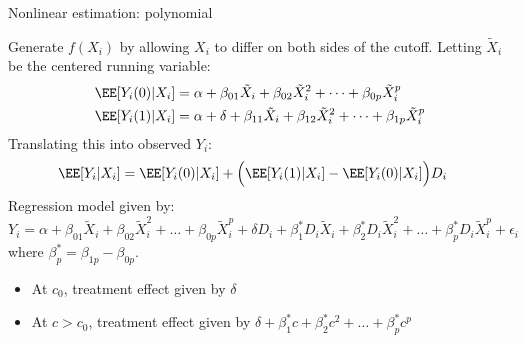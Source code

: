 \begin{frame}{Nonlinear estimation: polynomial}

Generate $f(X_i)$ by allowing $X_i$ to differ on both sides of the cutoff. Letting $\tilde{X}_i$ be the centered running variable:
\begin{align*}
    \EE [Y_i (0) \vert X_i] &= \alpha + \beta_{01} \tilde{X}_i + \beta_{02} \tilde{X}_i^2 + \dots + \beta_{0p} \tilde{X}_i^p \\
    \EE [Y_i (1) \vert X_i] &= \alpha + \delta + \beta_{11} \tilde{X}_i + \beta_{12} \tilde{X}_i^2 + \dots + \beta_{1p} \tilde{X}_i^p \\
\end{align*}
Translating this into observed $Y_i$:
\begin{align*}
    \EE [Y_i \vert X_i] &= 
    \EE [Y_i (0) \vert X_i] + \Big( \EE [Y_i (1) \vert X_i] - \EE [Y_i (0) \vert X_i] \Big) D_i 
\end{align*}
Regression model given by:
\begin{equation*}
    Y_i = \alpha + \beta_{01} \tilde{X}_i + \beta_{02} \tilde{X}_i^2 + \dots + \beta_{0p} \tilde{X}_i^p
    + \delta D_i
    + \beta_{1}^* D_i \tilde{X}_i + \beta_{2}^* D_i \tilde{X}_i^2 + \dots + \beta_{p}^* D_i \tilde{X}_i^p + \epsilon_i
\end{equation*}
where $\beta_{p}^* = \beta_{1p} - \beta_{0p}$. 
\begin{itemize}
    \item At $c_0$, treatment effect given by $\delta$
    \item At $c > c_0$, treatment effect given by $\delta + \beta_1^* c + \beta_2^* c^2 + \dots + \beta_p^* c^p$
\end{itemize}

\end{frame}

